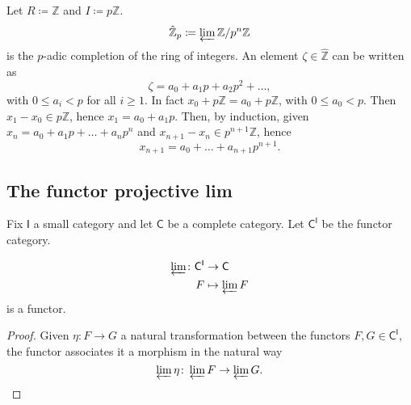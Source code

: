 \begin{ex}
	Let $R \coloneqq \mathbb{Z}$ and $I \coloneqq p  \mathbb{Z}$.
	\begin{equation}
		\hat{\mathbb{Z}}_p \coloneqq \varprojlim \mathbb{Z}/p^n \mathbb{Z}
	\end{equation} 
	is the $p$-adic completion of the ring of integers.
	An element $\zeta \in \hat{\mathbb{Z}}$ can be written as
	\begin{equation}
	\zeta = a_0 + a_1 p + a_2 p^2 + \ldots
	,\end{equation} 
	with $0 \leq a_i < p$ for all  $i \geq 1$.
	In fact $x_0 + p \mathbb{Z} = a_0 + p\mathbb{Z}$, with $0 \leq a_0 < p$.
	Then $x_1 - x_0 \in p \mathbb{Z}$, hence $x_1 = a_0 + a_1 p$.
	Then, by induction, given  $x_n = a_0 + a_1 p + \ldots + a_{n} p^{n}$ and $x_{n+1} - x_n \in p^{n+1} \mathbb{Z}$, hence
	\begin{equation}
	x_{n+1} = a_0 + \ldots + a_{n+1} p^{n+1}
	.\end{equation} 
\end{ex} 

\subsection{The functor projective lim}
Fix $\mathsf{I}$ a small category and let $\mathsf{C}$ be a complete category.
Let $\mathsf{C}^{\mathsf{I}}$ be the functor category.

\begin{prop}
	\begin{align}
		\varprojlim\colon \mathsf{C}^{\mathsf{I}} &\to \mathsf{C} \\
		F &\mapsto \varprojlim F
	\end{align} 
	is a functor.
\end{prop} 	
\begin{proof}
	Given $\eta\colon F \to G$ a natural transformation between the functors
	$F, G \in \mathsf{C}^{\mathsf{I}}$, the functor associates it a morphism in the natural way
	\begin{equation*}
	\varprojlim \eta\colon \varprojlim F \to \varprojlim G
	.\qedhere\end{equation*} 
\end{proof}

